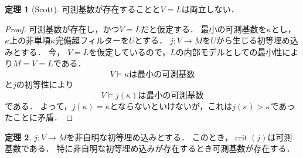\documentclass[uplatex]{jsarticle}
\newcommand{\crit}{\operatorname{crit}}
\theoremstyle{definition}
\newtheorem{thm}{定理}[section]
\begin{document}
	\begin{thm}[Scott]
		可測基数が存在することと$V = L$は両立しない．
	\end{thm}
	\begin{proof}
		可測基数が存在し，かつ$V = L$だと仮定する．
		最小の可測基数を$\kappa$とし，$\kappa$上の非単項$\kappa$完備超フィルターを$U$とする．
		$j \colon V \to M$を$U$から生じる初等埋め込みとする．
		今， $V = L$を仮定しているので，$L$の内部モデルとしての最小性により$M = V = L$である．
		\[V \models \text{$\kappa$は最小の可測基数}\]
		と$j$の初等性により
		\[V \models \text{$j(\kappa)$は最小の可測基数}\]
		である．
		よって，$j(\kappa) = \kappa$とならないといけないが，これは$j(\kappa) > \kappa$であったことに矛盾．
	\end{proof}
	
	\begin{thm}\label{thm:elemembimpliesmeas}
		$j \colon V \to M$を非自明な初等埋め込みとする．
		このとき，$\crit(j)$は可測基数である．
		特に非自明な初等埋め込みが存在するとき可測基数が存在する．
	\end{thm}
\end{document}
